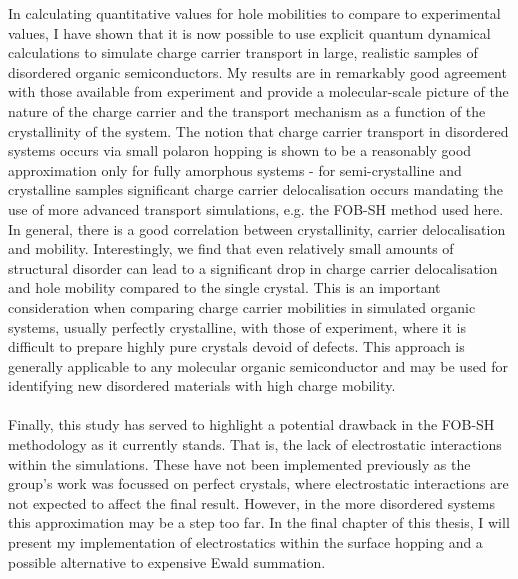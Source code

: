In calculating quantitative values for hole mobilities to compare to experimental values, I have shown that it is now possible to use explicit quantum dynamical calculations to simulate charge carrier transport in large, realistic samples of disordered organic semiconductors. My results are in remarkably good agreement with those available from experiment and provide a molecular-scale picture of the nature of the charge carrier and the transport mechanism as a function of the crystallinity of the system. The notion that charge carrier transport in disordered systems occurs via small polaron hopping is shown to be a reasonably good approximation only for fully amorphous systems - for semi-crystalline and crystalline samples significant charge carrier delocalisation occurs mandating the use of more advanced transport simulations, e.g.  the FOB-SH method used here. In general, there is a good correlation between crystallinity, carrier delocalisation and mobility.  Interestingly, we find that even relatively small amounts of structural disorder can lead to a significant drop in charge carrier delocalisation and hole mobility compared to the single crystal. This is an important consideration when comparing charge carrier mobilities in simulated organic systems, usually perfectly crystalline, with those of experiment, where it is difficult to prepare highly pure crystals devoid of defects. This approach is generally applicable to any molecular organic semiconductor and may be used for identifying new disordered materials with high charge mobility. 
\\\\
Finally, this study has served to highlight a potential drawback in the FOB-SH methodology as it currently stands. That is, the lack of electrostatic interactions within the simulations. These have not been implemented previously as the group's work was focussed on perfect crystals, where electrostatic interactions are not expected to affect the final result. However, in the more disordered systems this approximation may be a step too far. In the final chapter of this thesis, I will present my implementation of electrostatics within the surface hopping and a possible alternative to expensive Ewald summation.



